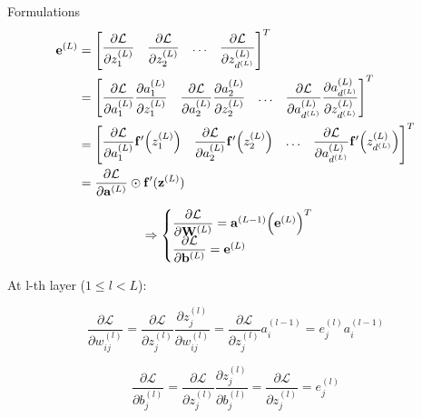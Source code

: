 \documentclass[10pt]{beamer}
\theoremstyle{remark}
\theoremstyle{definition}
\begin{document}
\begin{frame}[allowframebreaks]{Formulations}
	\begin{equation}
		\begin{aligned}
			\bold{e}^{(L)}&=\begin{bmatrix} \dfrac{\partial\mathcal{L}}{\partial z_1^{(L)}} & \dfrac{\partial\mathcal{L}}{\partial z_2^{(L)}} & \dots & \dfrac{\partial\mathcal{L}}{\partial z_{d^{(L)}}^{(L)}} \end{bmatrix}^T\\&=\begin{bmatrix} \dfrac{\partial\mathcal{L}}{\partial a_1^{(L)}}\dfrac{\partial a_1^{(L)}}{\partial z_1^{(L)}} & \dfrac{\partial\mathcal{L}}{\partial a_2^{(L)}}\dfrac{\partial a_2^{(L)}}{\partial z_2^{(L)}} & \dots & \dfrac{\partial\mathcal{L}}{\partial a_{d^{(L)}}^{(L)}}\dfrac{\partial a_{d^{(L)}}^{(L)}}{\partial z_{d^{(L)}}^{(L)}} \end{bmatrix}^T\\&=\begin{bmatrix} \dfrac{\partial\mathcal{L}}{\partial a_1^{(L)}}\bold{f}^{\prime}\Big(z_1^{(L)}\Big) & \dfrac{\partial\mathcal{L}}{\partial a_2^{(L)}}\bold{f}^{\prime}\Big(z_2^{(L)}\Big) & \dots & \dfrac{\partial\mathcal{L}}{\partial a_{d^{(L)}}^{(L)}}\bold{f}^{\prime}\Big(z_{d^{(L)}}^{(L)}\Big) \end{bmatrix}^T\\&=\dfrac{\partial \mathcal{L}}{\partial \bold{a}^{(L)}} \odot \bold{f}^{\prime}(\bold{z}^{(L)})
		\end{aligned}
	\end{equation}

	\begin{equation}
		\Rightarrow \begin{cases}\dfrac{\partial \mathcal{L}}{\partial \bold{W}^{(L)}}=\bold{a}^{(L-1)}\Big(\bold{e}^{(L)}\Big)^T \\ \dfrac{\partial \mathcal{L}}{\partial \bold{b}^{(L)}}=\bold{e}^{(L)} \end{cases}
	\end{equation}

	At l-th layer ($1 \leq l < L$):

	\begin{equation}
		\dfrac{\partial \mathcal{L}}{\partial w_{ij}^{(l)}}=\dfrac{\partial \mathcal{L}}{\partial z_j^{(l)}}\dfrac{\partial z_j^{(l)}}{\partial w_{ij}^{(l)}}=\dfrac{\partial \mathcal{L}}{\partial z_j^{(l)}} a_i^{(l-1)}=e_j^{(l)}a_i^{(l-1)}
	\end{equation}

	\begin{equation}
		\dfrac{\partial \mathcal{L}}{\partial b_j^{(l)}}=\dfrac{\partial \mathcal{L}}{\partial z_j^{(l)}}\dfrac{\partial z_j^{(l)}}{\partial b_j^{(l)}}=\dfrac{\partial \mathcal{L}}{\partial z_j^{(l)}} = e_j^{(l)}
	\end{equation}


\end{frame}
\end{document}
